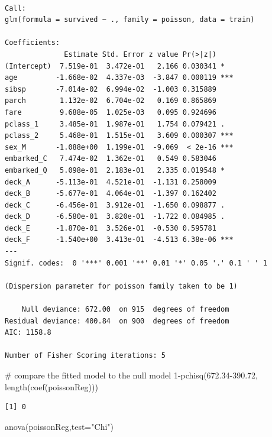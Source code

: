 \documentclass[
  letterpaper,
  DIV=11,
  numbers=noendperiod]{scrartcl}
\newenvironment{Shaded}{\begin{snugshade}}{\end{snugshade}}
\newcommand{\AttributeTok}[1]{\textcolor[rgb]{0.40,0.45,0.13}{#1}}
\newcommand{\CommentTok}[1]{\textcolor[rgb]{0.37,0.37,0.37}{#1}}
\newcommand{\DecValTok}[1]{\textcolor[rgb]{0.68,0.00,0.00}{#1}}
\newcommand{\FloatTok}[1]{\textcolor[rgb]{0.68,0.00,0.00}{#1}}
\newcommand{\FunctionTok}[1]{\textcolor[rgb]{0.28,0.35,0.67}{#1}}
\newcommand{\NormalTok}[1]{\textcolor[rgb]{0.00,0.23,0.31}{#1}}
\newcommand{\SpecialCharTok}[1]{\textcolor[rgb]{0.37,0.37,0.37}{#1}}
\newcommand{\StringTok}[1]{\textcolor[rgb]{0.13,0.47,0.30}{#1}}
\begin{document}
\begin{verbatim}

Call:
glm(formula = survived ~ ., family = poisson, data = train)

Coefficients:
              Estimate Std. Error z value Pr(>|z|)    
(Intercept)  7.519e-01  3.472e-01   2.166 0.030341 *  
age         -1.668e-02  4.337e-03  -3.847 0.000119 ***
sibsp       -7.014e-02  6.994e-02  -1.003 0.315889    
parch        1.132e-02  6.704e-02   0.169 0.865869    
fare         9.688e-05  1.025e-03   0.095 0.924696    
pclass_1     3.485e-01  1.987e-01   1.754 0.079421 .  
pclass_2     5.468e-01  1.515e-01   3.609 0.000307 ***
sex_M       -1.088e+00  1.199e-01  -9.069  < 2e-16 ***
embarked_C   7.474e-02  1.362e-01   0.549 0.583046    
embarked_Q   5.098e-01  2.183e-01   2.335 0.019548 *  
deck_A      -5.113e-01  4.521e-01  -1.131 0.258009    
deck_B      -5.677e-01  4.064e-01  -1.397 0.162402    
deck_C      -6.456e-01  3.912e-01  -1.650 0.098877 .  
deck_D      -6.580e-01  3.820e-01  -1.722 0.084985 .  
deck_E      -1.870e-01  3.526e-01  -0.530 0.595781    
deck_F      -1.540e+00  3.413e-01  -4.513 6.38e-06 ***
---
Signif. codes:  0 '***' 0.001 '**' 0.01 '*' 0.05 '.' 0.1 ' ' 1

(Dispersion parameter for poisson family taken to be 1)

    Null deviance: 672.00  on 915  degrees of freedom
Residual deviance: 400.84  on 900  degrees of freedom
AIC: 1158.8

Number of Fisher Scoring iterations: 5
\end{verbatim}

\begin{Shaded}
\begin{Highlighting}[]
\CommentTok{\# compare the fitted model to the null model}
\DecValTok{1}\SpecialCharTok{{-}}\FunctionTok{pchisq}\NormalTok{(}\FloatTok{672.34{-}390.72}\NormalTok{, }\FunctionTok{length}\NormalTok{(}\FunctionTok{coef}\NormalTok{(poissonReg)))}
\end{Highlighting}
\end{Shaded}

\begin{verbatim}
[1] 0
\end{verbatim}

\begin{Shaded}
\begin{Highlighting}[]
\FunctionTok{anova}\NormalTok{(poissonReg,}\AttributeTok{test=}\StringTok{"Chi"}\NormalTok{)}
\end{Highlighting}
\end{Shaded}
\end{document}
